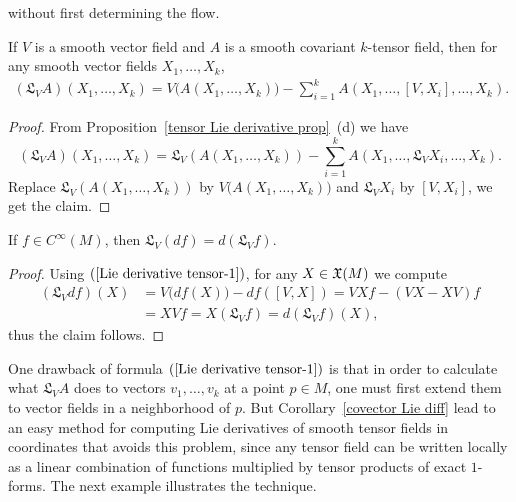 without first determining the flow.
\begin{corollary}\label{Lie derivative tensor}
If $V$ is a smooth vector field and $A$ is a smooth covariant $k$-tensor field, then for any smooth vector fields $X_1,\dots,X_k$,
\begin{align}\label{Lie derivative tensor-1}
(\mathfrak{L}_VA)(X_1,\dots,X_k)=V\big(A(X_1,\dots,X_k)\big)-\sum_{i=1}^{k}A(X_1,\dots,[V,X_i],\dots,X_k).
\end{align}
\end{corollary}
\begin{proof}
From Proposition~\ref{tensor Lie derivative prop}~(d) we have
\[(\mathfrak{L}_VA)(X_1,\dots,X_k)=\mathfrak{L}_V(A(X_1,\dots,X_k))-\sum_{i=1}^{k}A(X_1,\dots,\mathfrak{L}_VX_i,\dots,X_k).\]
Replace $\mathfrak{L}_V(A(X_1,\dots,X_k))$ by $V\big(A(X_1,\dots,X_k)\big)$ and $\mathfrak{L}_VX_i$ by $[V,X_i]$, we get the claim.
\end{proof}
\begin{corollary}\label{covector Lie diff}
If $f\in C^\infty(M)$, then $\mathfrak{L}_V(df)=d(\mathfrak{L}_Vf)$.
\end{corollary}
\begin{proof}
Using $(\ref{Lie derivative tensor-1})$, for any $X\in\mathfrak{X}(M)$ we compute
\begin{align*}
(\mathfrak{L}_Vdf)(X)&=V\big(df(X)\big)-df([V,X])=VXf-(VX-XV)f\\
&=XVf=X(\mathfrak{L}_Vf)=d(\mathfrak{L}_Vf)(X),
\end{align*}
thus the claim follows.
\end{proof}
One drawback of formula $(\ref{Lie derivative tensor-1})$ is that in order to calculate what $\mathfrak{L}_VA$ does to vectors $v_1,\dots,v_k$ at a point $p\in M$, one must first extend them to vector fields in a neighborhood of $p$. But Corollary~\ref{covector Lie diff} lead to an easy method for computing Lie derivatives of smooth tensor fields in coordinates that avoids this problem, since any tensor field can be written locally as a linear combination of functions multiplied by tensor products of exact $1$-forms. The next example illustrates the technique.
